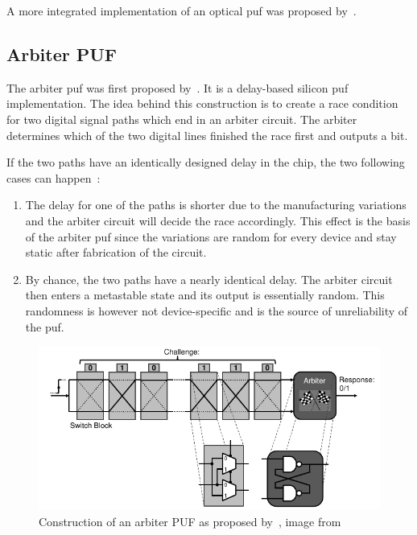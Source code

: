 A more integrated implementation of an optical \gls{puf} was proposed by~\cite{Rhrmair2013}.

\subsection{Arbiter PUF}

The arbiter \gls{puf} was first proposed by~\cite{Lee2004}. It is a delay-based silicon \gls{puf} implementation. The idea behind this construction is to create a race condition for two digital signal paths which end in an arbiter circuit. The arbiter determines which of the two digital lines finished the race first and outputs a bit.

If the two paths have an identically designed delay in the chip, the two following cases can happen~\cite{Maes2013}:

\begin{enumerate}
    \item The delay for one of the paths is shorter due to the manufacturing variations and the arbiter circuit will decide the race accordingly. This effect is the basis of the arbiter \gls{puf} since the variations are random for every device and stay static after fabrication of the circuit.
    \item By chance, the two paths have a nearly identical delay. The arbiter circuit then enters a metastable state and its output is essentially random. This randomness is however not device-specific and is the source of unreliability of the \gls{puf}.
\end{enumerate}

\begin{figure}[h!]
    \centering
    \captionsetup{justification=centering,margin=0.5cm}
    \includegraphics[width=\textwidth]{images/arbiter_puf.pdf}
    \caption[Construction of an arbiter PUF]{Construction of an arbiter PUF as proposed by~\cite{Lee2004}, image from~\cite{Maes2012}}
    \label{fig:arbiter_puf}
\end{figure}

